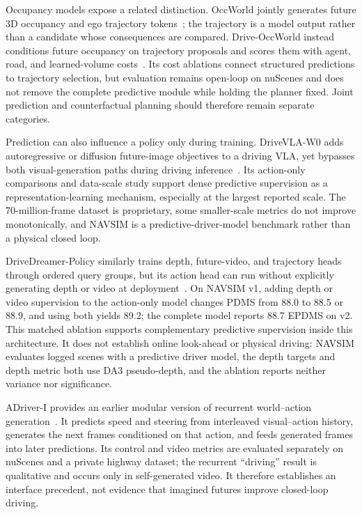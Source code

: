Occupancy models expose a related distinction. OccWorld jointly generates future 3D occupancy and ego trajectory tokens~\cite{zheng2024occworld}; the trajectory is a model output rather than a candidate whose consequences are compared. Drive-OccWorld instead conditions future occupancy on trajectory proposals and scores them with agent, road, and learned-volume costs~\cite{yang2025driveoccworld}. Its cost ablations connect structured predictions to trajectory selection, but evaluation remains open-loop on nuScenes and does not remove the complete predictive module while holding the planner fixed. Joint prediction and counterfactual planning should therefore remain separate categories.

Prediction can also influence a policy only during training. DriveVLA-W0 adds autoregressive or diffusion future-image objectives to a driving VLA, yet bypasses both visual-generation paths during driving inference~\cite{li2026drivevlaw0}. Its action-only comparisons and data-scale study support dense predictive supervision as a representation-learning mechanism, especially at the largest reported scale. The 70-million-frame dataset is proprietary, some smaller-scale metrics do not improve monotonically, and NAVSIM is a predictive-driver-model benchmark rather than a physical closed loop.

DriveDreamer-Policy similarly trains depth, future-video, and trajectory heads through ordered query groups, but its action head can run without explicitly generating depth or video at deployment~\cite{zhou2026drivedreamerpolicy}. On NAVSIM v1, adding depth or video supervision to the action-only model changes PDMS from 88.0 to 88.5 or 88.9, and using both yields 89.2; the complete model reports 88.7 EPDMS on v2. This matched ablation supports complementary predictive supervision inside this architecture. It does not establish online look-ahead or physical driving: NAVSIM evaluates logged scenes with a predictive driver model, the depth targets and depth metric both use DA3 pseudo-depth, and the ablation reports neither variance nor significance.

ADriver-I provides an earlier modular version of recurrent world--action generation~\cite{jia2023adriveri}. It predicts speed and steering from interleaved visual--action history, generates the next frames conditioned on that action, and feeds generated frames into later predictions. Its control and video metrics are evaluated separately on nuScenes and a private highway dataset; the recurrent ``driving'' result is qualitative and occurs only in self-generated video. It therefore establishes an interface precedent, not evidence that imagined futures improve closed-loop driving.

